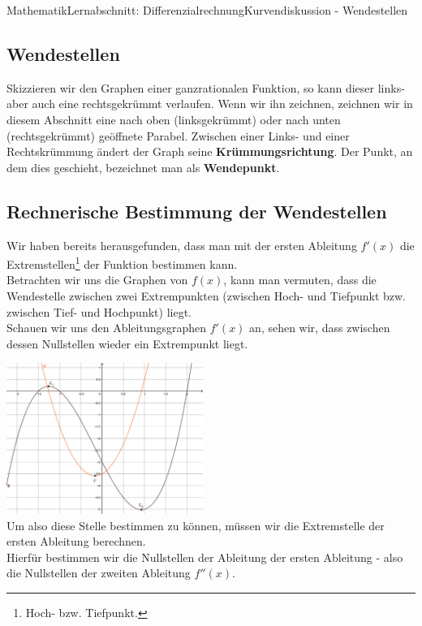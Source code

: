 \documentclass[11pt,twocolumn,oneside,openany,headings=optiontotoc,11pt,numbers=noenddot]{article}
\begin{document}
	\begin{worksheet}{Mathematik}{Lernabschnitt: Differenzialrechnung}{Kurvendiskussion - Wendestellen}
		\setcounter{section}{7}
		\setcounter{subsection}{4}
		\subsection{Wendestellen}
		Skizzieren wir den Graphen einer ganzrationalen Funktion, so kann dieser links- aber auch eine rechtsgekrümmt verlaufen. Wenn wir ihn zeichnen, zeichnen wir in diesem Abschnitt eine nach oben (linksgekrümmt) oder nach unten (rechtsgekrümmt) geöffnete Parabel. Zwischen einer Links- und einer Rechtskrümmung ändert der Graph seine \textbf{Krümmungsrichtung}. Der Punkt, an dem dies geschieht, bezeichnet man als \textbf{Wendepunkt}.
		\subsection*{Rechnerische Bestimmung der Wendestellen}
		Wir haben bereits herausgefunden, dass man mit der ersten Ableitung \(f'(x)\) die Extremstellen\footnote{Hoch- bzw. Tiefpunkt.} der Funktion bestimmen kann.\\
		Betrachten wir uns die Graphen von \(f(x)\), kann man vermuten, dass die Wendestelle zwischen zwei Extrempunkten (zwischen Hoch- und Tiefpunkt bzw. zwischen Tief- und Hochpunkt) liegt.\\
		Schauen wir uns den Ableitungsgraphen \(f'(x)\) an, sehen wir, dass zwischen dessen Nullstellen wieder ein Extrempunkt liegt.\\
		\par\noindent
		\includegraphics[width=0.48\textwidth]{../99_Bilder/045_WS_Einf.png}\\
		Um also diese Stelle bestimmen zu können, müssen wir die Extremstelle der ersten Ableitung berechnen.\\
		Hierfür bestimmen wir die Nullstellen der Ableitung der ersten Ableitung - also die Nullstellen der zweiten Ableitung \(f''(x)\).\\

\end{worksheet}
\end{document}
